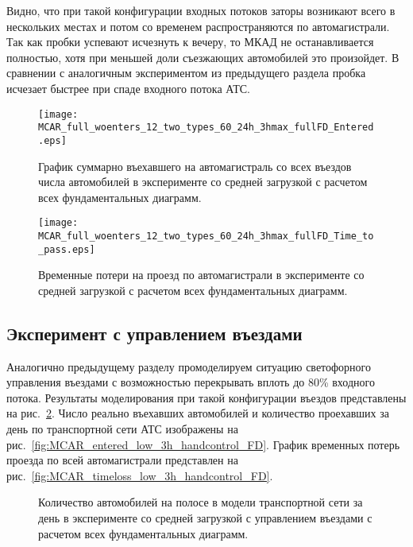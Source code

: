 Видно, что при такой конфигурации входных потоков заторы возникают всего в нескольких местах и потом со временем распространяются по автомагистрали.
Так как пробки успевают исчезнуть к вечеру, то МКАД не останавливается полностью, хотя при меньшей доли съезжающих автомобилей это произойдет.
В сравнении с аналогичным экспериментом из предыдущего раздела пробка исчезает быстрее при спаде входного потока АТС.
\begin{figure}[ht]
    \begin{minipage}[b][][b]{0.49\textwidth}
        \centering
        \texttt{[image: MCAR\_full\_woenters\_12\_two\_types\_60\_24h\_3hmax\_fullFD\_Entered.eps]}
        \caption{График суммарно въехавшего на автомагистраль со всех въездов числа автомобилей в эксперименте со средней загрузкой с расчетом всех фундаментальных диаграмм.}
        \label{fig:MCAR_entered_low_3h_FD}
    \end{minipage}
    \hfill
    \begin{minipage}[b][][b]{0.49\textwidth}
        \centering
        \texttt{[image: MCAR\_full\_woenters\_12\_two\_types\_60\_24h\_3hmax\_fullFD\_Time\_to\_pass.eps]}
        \caption{Временные потери на проезд по автомагистрали в эксперименте со средней загрузкой с расчетом всех фундаментальных диаграмм.}
        \label{fig:MCAR_timeloss_low_3h_FD}
    \end{minipage}
\end{figure}


\subsection{Эксперимент с управлением въездами}
Аналогично предыдущему разделу промоделируем ситуацию светофорного управления въездами с возможностью перекрывать вплоть до 80\% входного потока.
Результаты моделирования при такой конфигурации въездов представлены на рис.~\ref{fig:MCAR_heatmap_low_3h_handcontrol_FD}.
Число реально въехавших автомобилей и количество проехавших за день по транспортной сети АТС изображены на рис.~\ref{fig:MCAR_entered_low_3h_handcontrol_FD}.
График временных потерь проезда по всей автомагистрали представлен на рис.~\ref{fig:MCAR_timeloss_low_3h_handcontrol_FD}.
\begin{figure}[ht]
    \caption{Количество автомобилей на полосе в модели транспортной сети за день в эксперименте со средней загрузкой с управлением въездами с расчетом всех фундаментальных диаграмм.}
    \label{fig:MCAR_heatmap_low_3h_handcontrol_FD}
\end{figure}

